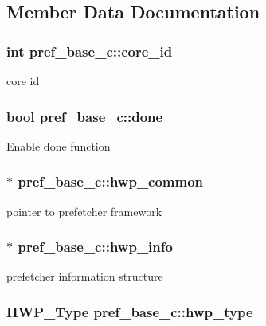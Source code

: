 \subsection{Member Data Documentation}
\hypertarget{classpref__base__c_ab0093a517b5e4f673a4c497af6ac0658}{
\subsubsection[{core\_\-id}]{\setlength{\rightskip}{0pt plus 5cm}int {\bf pref\_\-base\_\-c::core\_\-id}}}
\label{classpref__base__c_ab0093a517b5e4f673a4c497af6ac0658}
core id \hypertarget{classpref__base__c_a0b4fc71dbc57b37b14a3d690641095f8}{
\subsubsection[{done}]{\setlength{\rightskip}{0pt plus 5cm}bool {\bf pref\_\-base\_\-c::done}}}
\label{classpref__base__c_a0b4fc71dbc57b37b14a3d690641095f8}
Enable done function \hypertarget{classpref__base__c_a7e56ec8eb84f475c224c86ceabf858d9}{
\subsubsection[{hwp\_\-common}]{$\ast$ {\bf pref\_\-base\_\-c::hwp\_\-common}}}
\label{classpref__base__c_a7e56ec8eb84f475c224c86ceabf858d9}
pointer to prefetcher framework \hypertarget{classpref__base__c_a4bcc37c2e993a745957630fa8ea8d8e2}{
\subsubsection[{hwp\_\-info}]{$\ast$ {\bf pref\_\-base\_\-c::hwp\_\-info}}}
\label{classpref__base__c_a4bcc37c2e993a745957630fa8ea8d8e2}
prefetcher information structure \hypertarget{classpref__base__c_a6fb57b9239bf6a8241c0e3e8d67ba95b}{
\subsubsection[{hwp\_\-type}]{\setlength{\rightskip}{0pt plus 5cm}HWP\_\-Type {\bf pref\_\-base\_\-c::hwp\_\-type}}}
